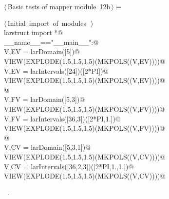 \documentclass[11pt,oneside]{article}	%
\begin{document}
\begin{flushleft} \small \label{scrap25}
\protect{}$\langle\,$Basic tests of mapper module\nobreak\ {\footnotesize 12b}$\,\rangle\equiv$
\vspace{-1ex}
\begin{list}{}{} \item
\mbox{}\verb@@\hbox{$\langle\,$Initial import of modules\nobreak\ {\footnotesize {}}$\,\rangle$}\verb@@\\
\mbox{}\verb@from larstruct import *@\\
\mbox{}\verb@if __name__=="__main__":@\\
\mbox{}\verb@   V,EV = larDomain([5])@\\
\mbox{}\verb@   VIEW(EXPLODE(1.5,1.5,1.5)(MKPOLS((V,EV))))@\\
\mbox{}\verb@   V,EV = larIntervals([24])([2*PI])@\\
\mbox{}\verb@   VIEW(EXPLODE(1.5,1.5,1.5)(MKPOLS((V,EV))))@\\
\mbox{}\verb@      @\\
\mbox{}\verb@   V,FV = larDomain([5,3])@\\
\mbox{}\verb@   VIEW(EXPLODE(1.5,1.5,1.5)(MKPOLS((V,FV))))@\\
\mbox{}\verb@   V,FV = larIntervals([36,3])([2*PI,1.])@\\
\mbox{}\verb@   VIEW(EXPLODE(1.5,1.5,1.5)(MKPOLS((V,FV))))@\\
\mbox{}\verb@      @\\
\mbox{}\verb@   V,CV = larDomain([5,3,1])@\\
\mbox{}\verb@   VIEW(EXPLODE(1.5,1.5,1.5)(MKPOLS((V,CV))))@\\
\mbox{}\verb@   V,CV = larIntervals([36,2,3])([2*PI,1.,1.])@\\
\mbox{}\verb@   VIEW(EXPLODE(1.5,1.5,1.5)(MKPOLS((V,CV))))@\\
\mbox{}\verb@@{\NWsep}
\end{list}
\vspace{-1ex}
\footnotesize\addtolength{\baselineskip}{-1ex}
\begin{list}{}{\setlength{\itemsep}{-\parsep}\setlength{\itemindent}{-\leftmargin}}
\item \NWtxtMacroRefIn\ .
\end{list}
\end{flushleft}
\end{document}
